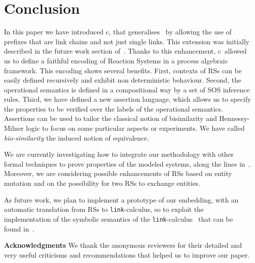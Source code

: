 
\section{Conclusion}\label{sec:conclusion}

In this paper we have introduced c\CNA, that generalises \CNA\ by allowing the use of prefixes that are link chains and not just single links.
This extension was initially described in the future work section of~\cite{BBB17}.
Thanks to this enhancement, c\CNA\ allowed us to define 
a faithful encoding of 
Reaction Systems in a process algebraic framework.  
This encoding
shows several benefits.
First, contexts of RSs can be easily defined recursively and exhibit non deterministic behaviour.
Second, the operational semantics is defined in a compositional way by a set of SOS inference rules.
Third, we have defined a new assertion language, which allows us to specify
the properties to be verified over the labels of the operational semantics.
Assertions can be used to tailor the classical notion of bisimilarity and Hennessy-Milner logic to focus on some particular aspects or experiments. We have called \emph{bio-similarity} the induced notion of equivalence.

We are currently investigating how to integrate our methodology
with other formal techniques to prove 
properties of the modeled systems, along the lines in~\cite{CFHOT15,OCHF16,BBGLBH2017,BBF15}.
Moreover, we are considering possible enhancements of RSs based on entity mutation and on the possibility for two RSs to exchange entities.

As future work, we plan to implement a prototype of our 
embedding,
with an automatic translation from RSs to  {\tt link}-calculus, so to exploit the implementation of  the symbolic semantics of 
the {\tt link}-calculus~\cite{BrodoO17} that can be found in~\cite{tool}.

\medskip

\noindent
{\small {\bf Acknowledgments}
We thank the anonymous reviewers for their detailed and very useful 
criticisms and recommendations that helped us to improve our paper.}
